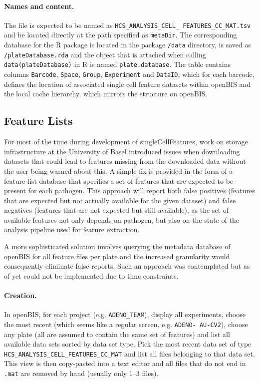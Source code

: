 \paragraph{Names and content.}
The file is expected to be named as \texttt{HCS_ANALYSIS_CELL_ FEATURES_CC_MAT.tsv} and be located directly at the path specified as \texttt{metaDir}. The corresponding database for the R package is located in the package \texttt{/data} directory, is saved as \texttt{/plateDatabase.rda} and the object that is attached when calling \texttt{data(plateDatabase)} in R is named \texttt{plate.database}. The table contains columns \texttt{Barcode}, \texttt{Space}, \texttt{Group}, \texttt{Experiment} and \texttt{DataID}, which for each barcode, defines the location of associated single cell feature datasets within openBIS and the local cache hierarchy, which mirrors the structure on openBIS.

\subsection{Feature Lists}
For most of the time during development of singleCellFeatures, work on storage infrastructure at the University of Basel introduced issues when downloading datasets that could lead to features missing from the downloaded data without the user being warned about this. A simple fix is provided in the form of a feature list database that specifies a set of features that are expected to be present for each pathogen. This approach will report both false positives (features that are expected but not actually available for the given dataset) and false negatives (features that are not expected but still available), as the set of available features not only depends on pathogen, but also on the state of the analysis pipeline used for feature extraction.

A more sophisticated solution involves querying the metadata database of openBIS for all feature files per plate and the increased granularity would consequently eliminate false reports. Such an approach was contemplated but as of yet could not be implemented due to time constraints.

\paragraph{Creation.}
In openBIS, for each project (e.g. \texttt{ADENO_TEAM}), display all experiments, choose the most recent (which seems like a regular screen, e.g. \texttt{ADENO- AU-CV2}), choose any plate (all are assumed to contain the same set of features) and list all available data sets sorted by data set type. Pick the most recent data set of type \texttt{HCS_ANALYSIS_CELL_FEATURES_CC_MAT} and list all files belonging to that data set. This view is then copy-pasted into a text editor and all files that do not end in \texttt{.mat} are removed by hand (usually only 1--3 files).

